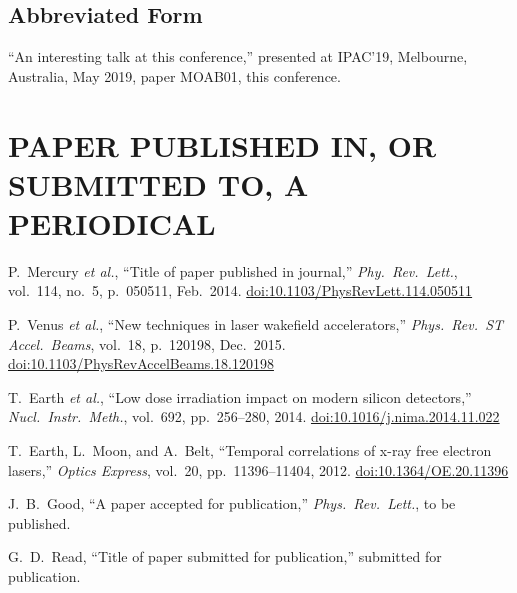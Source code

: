 \subsection{Abbreviated Form}

\begin{thebibliography}{9} %
\setcounter{enumi}{4}
	“An interesting talk at this conference,”
	presented at IPAC’19, Melbourne, Australia, May 2019, 
	paper MOAB01, this conference.
\end{thebibliography}


\vspace*{-.5\baselineskip}
\section{PAPER PUBLISHED IN, OR SUBMITTED TO, A PERIODICAL}

\begin{thebibliography}{99} %
  \setcounter{enumi}{5}
		P.~Mercury \emph{et al.},
		“Title of paper published in journal,”
		\emph{Phy.\ Rev.\ Lett.}, vol.\ 114, no.\ 5,
		p.\ 050511, Feb.\ 2014.
		\url{doi:10.1103/PhysRevLett.114.050511}

		P.~Venus \emph{et al.},
		“New techniques in laser wakefield accelerators,”
		\emph{Phys.\ Rev.\ ST Accel.\ Beams}, vol.\ 18,
		p.\ 120198, Dec.~2015. %
		\url{doi:10.1103/PhysRevAccelBeams.18.120198} 

		T.~Earth \emph{et al.},
		“Low dose irradiation impact on modern silicon detectors,”
		\emph{Nucl.\ Instr.\ Meth.}, vol.\ 692, pp.\ 256--280, 2014.
		\url{doi:10.1016/j.nima.2014.11.022}
	
		T.~Earth, L.~Moon, and A.~Belt,
		“Temporal correlations of x-ray free electron lasers,”
		\emph{Optics Express}, vol.\ 20, pp.\ 11396--11404, 2012.
		\url{doi:10.1364/OE.20.11396}

		J.~B.~Good,
		“A paper accepted for publication,”
		\emph{Phys.\ Rev.\ Lett.}, to be published.

		G.~D.~Read,
		“Title of paper submitted for publication,”
		submitted for publication.
\end{thebibliography}

